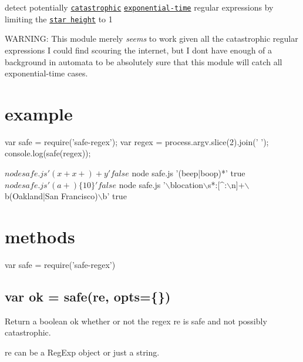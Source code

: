 detect potentially \href{http://regular-expressions.mobi/catastrophic.html}{\tt catastrophic} \href{http://perlgeek.de/blog-en/perl-tips/in-search-of-an-exponetial-regexp.html}{\tt exponential-\/time} regular expressions by limiting the \href{https://en.wikipedia.org/wiki/Star_height}{\tt star height} to 1

W\+A\+R\+N\+I\+NG\+: This module merely {\itshape seems} to work given all the catastrophic regular expressions I could find scouring the internet, but I don\textquotesingle{}t have enough of a background in automata to be absolutely sure that this module will catch all exponential-\/time cases.

\href{https://ci.testling.com/substack/safe-regex}{\tt }

\href{http://travis-ci.org/substack/safe-regex}{\tt }

\section*{example}


\begin{DoxyCode}
var safe = require('safe-regex');
var regex = process.argv.slice(2).join(' ');
console.log(safe(regex));
\end{DoxyCode}



\begin{DoxyCode}
$ node safe.js '(x+x+)+y'
false
$ node safe.js '(beep|boop)*'
true
$ node safe.js '(a+)\{10\}'
false
$ node safe.js '\(\backslash\)blocation\(\backslash\)s*:[^:\(\backslash\)n]+\(\backslash\)b(Oakland|San Francisco)\(\backslash\)b'
true
\end{DoxyCode}


\section*{methods}


\begin{DoxyCode}
var safe = require('safe-regex')
\end{DoxyCode}


\subsection*{var ok = safe(re, opts=\{\})}

Return a boolean {\ttfamily ok} whether or not the regex {\ttfamily re} is safe and not possibly catastrophic.

{\ttfamily re} can be a {\ttfamily Reg\+Exp} object or just a string.

